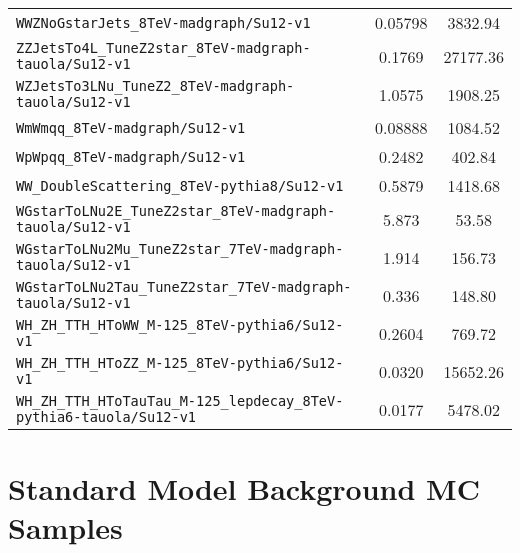 \begin{table}[!H]
{\begin{minipage}{\textwidth}
\begin{tabular}{lcc}
{\tt WWZNoGstarJets\_8TeV-madgraph/Su12-v1                               } & 0.05798           & 3832.94           \\
{\tt ZZJetsTo4L\_TuneZ2star\_8TeV-madgraph-tauola/Su12-v1                } & 0.1769            & 27177.36          \\
{\tt WZJetsTo3LNu\_TuneZ2\_8TeV-madgraph-tauola/Su12-v1                  } & 1.0575            & 1908.25           \\
{\tt WmWmqq\_8TeV-madgraph/Su12-v1                                       } & 0.08888           & 1084.52           \\
{\tt WpWpqq\_8TeV-madgraph/Su12-v1                                       } & 0.2482            & 402.84            \\
{\tt WW\_DoubleScattering\_8TeV-pythia8/Su12-v1                          } & 0.5879            & 1418.68           \\
{\tt WGstarToLNu2E\_TuneZ2star\_8TeV-madgraph-tauola/Su12-v1             } & 5.873             & 53.58             \\
{\tt WGstarToLNu2Mu\_TuneZ2star\_7TeV-madgraph-tauola/Su12-v1            } & 1.914             & 156.73            \\
{\tt WGstarToLNu2Tau\_TuneZ2star\_7TeV-madgraph-tauola/Su12-v1           } & 0.336             & 148.80            \\
{\tt WH\_ZH\_TTH\_HToWW\_M-125\_8TeV-pythia6/Su12-v1                     } & 0.2604            & 769.72            \\
{\tt WH\_ZH\_TTH\_HToZZ\_M-125\_8TeV-pythia6/Su12-v1                     } & 0.0320            & 15652.26          \\
{\tt WH\_ZH\_TTH\_HToTauTau\_M-125\_lepdecay\_8TeV-pythia6-tauola/Su12-v1} & 0.0177            & 5478.02           \\
\hline\hline
\end{tabular}
\end{minipage}
}
\end{table}

\section{Standard Model Background MC Samples}
\label{sec:mc_details_sm}

